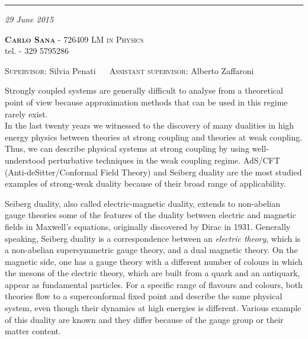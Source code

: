 \documentclass[a4paper,11pt]{article}
\date{}
\title{ \textbf{\boldmath{4D to 3D reduction of Seiberg duality for $SU(N)$ susy gauge theories with adjoint matter: a partition function approach }}	}
\author{}
\begin{document}
\maketitle
\vspace*{-2.3cm}
\begin{center}
\rule{\textwidth}{0.6pt}
\textit {29 June 2015} \\
 \end{center}
\vspace{-0.3cm}
	 \textbf{\noindent%
	 \scshape%
	 Carlo Sana} - \textsf{726409}  \hfill
 {\scshape LM in Physics} 
\\
\noindent  tel. \textsf{- 329 5795286}\\
\vspace{-0.5cm}
\begin{center}
{\scshape Supervisor}: 
\textsf{Silvia Penati} 
~~
{\scshape Assistant supervisor}:
\textsf{Alberto Zaffaroni}

\end{center}



Strongly coupled systems are generally difficult to analyse from a theoretical point of view because approximation methods that can be used in this regime rarely exist.\\
In the last twenty years we witnessed to the discovery of many dualities in high energy physics between theories at strong coupling and theories at weak coupling.
Thus, we can describe physical systems at strong coupling by using well-understood perturbative techniques in the weak coupling regime. 
AdS/CFT (Anti-deSitter/Conformal Field Theory) and Seiberg duality are the most studied examples of strong-weak duality because of their broad range of applicability.

Seiberg duality, also called electric-magnetic duality, extends to non-abelian gauge theories some of the features of the duality between electric and magnetic fields in Maxwell's equations, originally discovered by Dirac in 1931.
Generally speaking, Seiberg duality is a correspondence between an \emph{electric theory}, which is a non-abelian supersymmetric gauge theory, and a dual magnetic theory. 
On the magnetic side, one has a gauge theory with a different number of colours  in which the mesons of the electric theory, which are built from a quark and an antiquark, appear as fundamental particles.
For a specific range of flavours and colours, both theories flow to a superconformal fixed point and describe the same physical system, even though their dynamics at high energies is different.
Various example of this duality are known and they differ because of the gauge group or their matter content.
\end{document}
